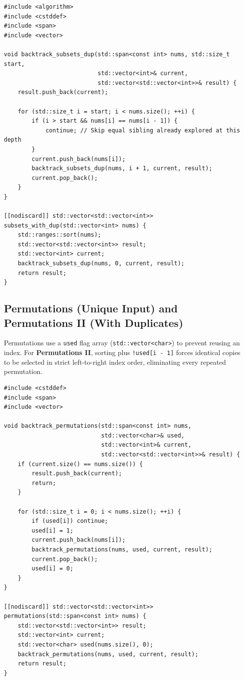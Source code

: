 \documentclass[11pt,a4paper]{article}
\theoremstyle{definition}
\begin{document}
\begin{lstlisting}[caption={Subsets II: Deduplicating Repeated Elements via std::ranges::sort}]
#include <algorithm>
#include <cstddef>
#include <span>
#include <vector>

void backtrack_subsets_dup(std::span<const int> nums, std::size_t start,
                           std::vector<int>& current,
                           std::vector<std::vector<int>>& result) {
    result.push_back(current);

    for (std::size_t i = start; i < nums.size(); ++i) {
        if (i > start && nums[i] == nums[i - 1]) {
            continue; // Skip equal sibling already explored at this depth
        }
        current.push_back(nums[i]);
        backtrack_subsets_dup(nums, i + 1, current, result);
        current.pop_back();
    }
}

[[nodiscard]] std::vector<std::vector<int>> subsets_with_dup(std::vector<int> nums) {
    std::ranges::sort(nums);
    std::vector<std::vector<int>> result;
    std::vector<int> current;
    backtrack_subsets_dup(nums, 0, current, result);
    return result;
}
\end{lstlisting}

\subsection{Permutations (Unique Input) and Permutations II (With Duplicates)}

Permutations use a \texttt{used} flag array (\texttt{std::vector<char>}) to prevent reusing an index. For \textbf{Permutations II}, sorting plus \texttt{!used[i - 1]} forces identical copies to be selected in strict left-to-right index order, eliminating every repeated permutation.

\begin{lstlisting}[caption={Permutations on Distinct Elements}]
#include <cstddef>
#include <span>
#include <vector>

void backtrack_permutations(std::span<const int> nums,
                            std::vector<char>& used,
                            std::vector<int>& current,
                            std::vector<std::vector<int>>& result) {
    if (current.size() == nums.size()) {
        result.push_back(current);
        return;
    }

    for (std::size_t i = 0; i < nums.size(); ++i) {
        if (used[i]) continue;
        used[i] = 1;
        current.push_back(nums[i]);
        backtrack_permutations(nums, used, current, result);
        current.pop_back();
        used[i] = 0;
    }
}

[[nodiscard]] std::vector<std::vector<int>> permutations(std::span<const int> nums) {
    std::vector<std::vector<int>> result;
    std::vector<int> current;
    std::vector<char> used(nums.size(), 0);
    backtrack_permutations(nums, used, current, result);
    return result;
}
\end{lstlisting}
\end{document}
